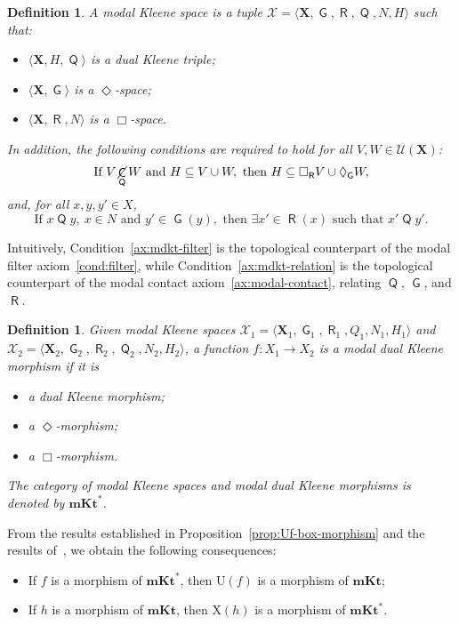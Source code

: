 \documentclass[10pt,a4paper]{amsart}
\newtheorem{definition}[theorem]{Definition}
\DeclareMathOperator{\con}{\mathsf{C}}
\DeclareMathOperator{\notcon}{\cancel{ \con}}
\DeclareMathOperator{\Q}{\mathsf{Q}}
\DeclareMathOperator{\G}{\mathsf{G}}
\DeclareMathOperator{\R}{\mathsf{R}}
\newcommand{\X}{\mathbf{X}}
\newcommand{\U}{\mathcal{U}}
\begin{document}
\begin{definition}
\label{def:modal-dual-kleene-triple}
A \emph{modal Kleene space} is a tuple $\mathcal{X}=\langle \X,\G,\R,\Q,N,H\rangle$ such that:
\begin{itemize}
    \item $\langle \X, H, \Q \rangle$ is a dual Kleene triple;
    \item $\langle \X, \G \rangle$ is a $\Diamond$-space;
    \item $\langle \X, \R, N \rangle$ is a $\Box$-space.
\end{itemize}
In addition, the following conditions are required to hold for all $V, W \in \U(\X)$:
\begin{equation}
\label{ax:mdkt-filter}
\text{If } V \notcon_{\Q} W \text{ and } H \subseteq V \cup W, \text{ then } H \subseteq \Box_{\R} V \cup \Diamond_{\G} W,
\end{equation}
and, for all $x, y, y' \in X$,
\begin{equation}
\label{ax:mdkt-relation}
\text{If } x\Q y,\ x \in N \text{ and } y' \in \G(y), \text{ then } \exists x' \in \R(x) \text{ such that } x'\Q y'.
\end{equation}
\end{definition}

Intuitively, Condition~\eqref{ax:mdkt-filter} is the topological counterpart of the modal filter axiom~\eqref{cond:filter}, while Condition~\eqref{ax:mdkt-relation} is the topological counterpart of the modal contact axiom~\eqref{ax:modal-contact}, relating $\Q$, $\G$, and $\R$.

\begin{definition}
\label{def:mdkt-morphism}
Given modal Kleene spaces $\mathcal{X}_1=\langle \X_1,\G_1,\R_1,Q_1,N_1,H_1\rangle$ and $\mathcal{X}_2=\langle \X_2,\G_2,\R_2,\Q_2,N_2,H_2\rangle$, a function $f\colon X_1\to X_2$ is a \emph{modal dual Kleene morphism} if it is
\begin{itemize}
    \item a dual Kleene morphism;
    \item a $\Diamond$-morphism;
    \item a $\Box$-morphism.
\end{itemize}

The category of modal Kleene spaces and modal dual Kleene morphisms is denoted by $\mathbf{mKt}^{*}$.
\end{definition}

From the results established in Proposition~\ref{prop:Uf-box-morphism} and the results of~\cite{jalali, petrovich1996}, we obtain the following consequences:
\begin{itemize}
    \item If $f$ is a morphism of $\mathbf{mKt}^{*}$, then $\mathrm{U}(f)$ is a morphism of $\mathbf{mKt}$;
    \item If $h$ is a morphism of $\mathbf{mKt}$, then $\mathrm{X}(h)$ is a morphism of $\mathbf{mKt}^{*}$.
\end{itemize}
\end{document}
